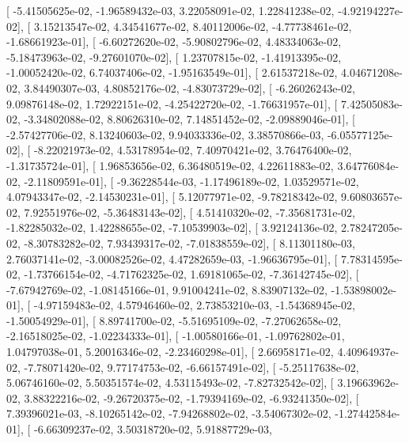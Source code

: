 \documentclass{article}
\begin{document}
       [ -5.41505625e-02,  -1.96589432e-03,   3.22058091e-02,
          1.22841238e-02,  -4.92194227e-02],
       [  3.15213547e-02,   4.34541677e-02,   8.40112006e-02,
         -4.77738461e-02,  -1.68661923e-01],
       [ -6.60272620e-02,  -5.90802796e-02,   4.48334063e-02,
         -5.18473963e-02,  -9.27601070e-02],
       [  1.23707815e-02,  -1.41913395e-02,  -1.00052420e-02,
          6.74037406e-02,  -1.95163549e-01],
       [  2.61537218e-02,   4.04671208e-02,   3.84490307e-03,
          4.80852176e-02,  -4.83073729e-02],
       [ -6.26026243e-02,   9.09876148e-02,   1.72922151e-02,
         -4.25422720e-02,  -1.76631957e-01],
       [  7.42505083e-02,  -3.34802088e-02,   8.80626310e-02,
          7.14851452e-02,  -2.09889046e-01],
       [ -2.57427706e-02,   8.13240603e-02,   9.94033336e-02,
          3.38570866e-03,  -6.05577125e-02],
       [ -8.22021973e-02,   4.53178954e-02,   7.40970421e-02,
          3.76476400e-02,  -1.31735724e-01],
       [  1.96853656e-02,   6.36480519e-02,   4.22611883e-02,
          3.64776084e-02,  -2.11809591e-01],
       [ -9.36228544e-03,  -1.17496189e-02,   1.03529571e-02,
          4.07943347e-02,  -2.14530231e-01],
       [  5.12077971e-02,  -9.78218342e-02,   9.60803657e-02,
          7.92551976e-02,  -5.36483143e-02],
       [  4.51410320e-02,  -7.35681731e-02,  -1.82285032e-02,
          1.42288655e-02,  -7.10539903e-02],
       [  3.92124136e-02,   2.78247205e-02,  -8.30783282e-02,
          7.93439317e-02,  -7.01838559e-02],
       [  8.11301180e-03,   2.76037141e-02,  -3.00082526e-02,
          4.47282659e-03,  -1.96636795e-01],
       [  7.78314595e-02,  -1.73766154e-02,  -4.71762325e-02,
          1.69181065e-02,  -7.36142745e-02],
       [ -7.67942769e-02,  -1.08145166e-01,   9.91004241e-02,
          8.83907132e-02,  -1.53898002e-01],
       [ -4.97159483e-02,   4.57946460e-02,   2.73853210e-03,
         -1.54368945e-02,  -1.50054929e-01],
       [  8.89741700e-02,  -5.51695109e-02,  -7.27062658e-02,
         -2.16518025e-02,  -1.02234333e-01],
       [ -1.00580166e-01,  -1.09762802e-01,   1.04797038e-01,
          5.20016346e-02,  -2.23460298e-01],
       [  2.66958171e-02,   4.40964937e-02,  -7.78071420e-02,
          9.77174753e-02,  -6.66157491e-02],
       [ -5.25117638e-02,   5.06746160e-02,   5.50351574e-02,
          4.53115493e-02,  -7.82732542e-02],
       [  3.19663962e-02,   3.88322216e-02,  -9.26720375e-02,
         -1.79394169e-02,  -6.93241350e-02],
       [  7.39396021e-03,  -8.10265142e-02,  -7.94268802e-02,
         -3.54067302e-02,  -1.27442584e-01],
       [ -6.66309237e-02,   3.50318720e-02,   5.91887729e-03,
\end{document}
